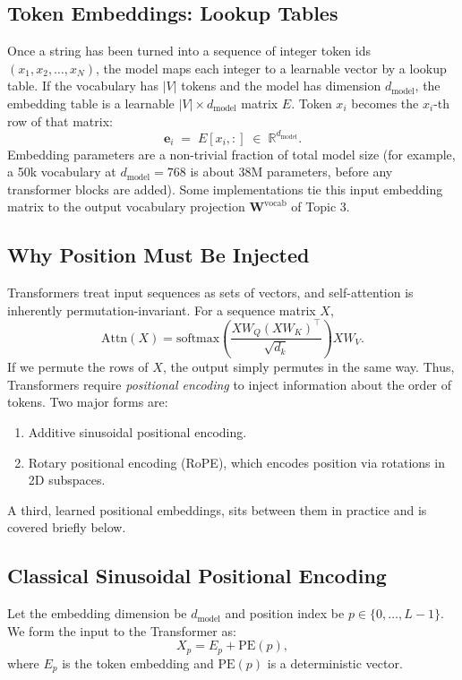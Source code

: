 \documentclass[11pt]{article}
\theoremstyle{remark}
\begin{document}
\subsection{Token Embeddings: Lookup Tables}

Once a string has been turned into a sequence of integer token ids \((x_1, x_2, \dots, x_N)\), the model maps each integer to a learnable vector by a lookup table. If the vocabulary has \(|V|\) tokens and the model has dimension \(d_{\text{model}}\), the embedding table is a learnable \(|V| \times d_{\text{model}}\) matrix \(E\). Token \(x_i\) becomes the \(x_i\)-th row of that matrix:
\[
\mathbf{e}_i \;=\; E[x_i, :] \;\in\; \mathbb{R}^{d_{\text{model}}}.
\]
Embedding parameters are a non-trivial fraction of total model size (for example, a 50k vocabulary at \(d_{\text{model}} = 768\) is about 38M parameters, before any transformer blocks are added). Some implementations tie this input embedding matrix to the output vocabulary projection \(\mathbf{W}^{\text{vocab}}\) of Topic 3.

\subsection{Why Position Must Be Injected}

Transformers treat input sequences as sets of vectors, and self-attention is inherently permutation-invariant. For a sequence matrix $X$,
\[
\text{Attn}(X) = \text{softmax}\!\left(\frac{XW_Q (XW_K)^\top}{\sqrt{d_k}}\right) XW_V.
\]
If we permute the rows of $X$, the output simply permutes in the same way.
Thus, Transformers require \emph{positional encoding} to inject information about the order of tokens. Two major forms are:
\begin{enumerate}[label=\arabic*)]
    \item Additive sinusoidal positional encoding.
    \item Rotary positional encoding (RoPE), which encodes position via rotations in 2D subspaces.
\end{enumerate}
A third, learned positional embeddings, sits between them in practice and is covered briefly below.

\subsection{Classical Sinusoidal Positional Encoding}

Let the embedding dimension be $d_{\text{model}}$ and position index be $p \in \{0,\dots,L-1\}$.
We form the input to the Transformer as:
\[
X_p = E_p + \text{PE}(p),
\]
where $E_p$ is the token embedding and $\text{PE}(p)$ is a deterministic vector.
\end{document}
